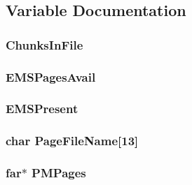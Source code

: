 \subsection{Variable Documentation}
\hypertarget{ID__PM_8H_af385634b054d3e3d81d85865b3d7e71e}{
\subsubsection[{ChunksInFile}]{ {\bf ChunksInFile}}}
\label{ID__PM_8H_af385634b054d3e3d81d85865b3d7e71e}
\hypertarget{ID__PM_8H_a0b3caaa008ec8ab4b8486880a825bad0}{
\subsubsection[{EMSPagesAvail}]{ {\bf EMSPagesAvail}}}
\label{ID__PM_8H_a0b3caaa008ec8ab4b8486880a825bad0}
\hypertarget{ID__PM_8H_ab35be0811b0150bb1a52eaad6d3d6340}{
\subsubsection[{EMSPresent}]{ {\bf EMSPresent}}}
\label{ID__PM_8H_ab35be0811b0150bb1a52eaad6d3d6340}
\hypertarget{ID__PM_8H_a3d2a1c78f3a8c484f8b2ed0cbe566453}{
\subsubsection[{PageFileName}]{\setlength{\rightskip}{0pt plus 5cm}char {\bf PageFileName}\mbox{[}13\mbox{]}}}
\label{ID__PM_8H_a3d2a1c78f3a8c484f8b2ed0cbe566453}
\hypertarget{ID__PM_8H_aac6e5bfd3ae3497c8b721679578d73f1}{
\subsubsection[{PMPages}]{ far$\ast$ {\bf PMPages}}}
\label{ID__PM_8H_aac6e5bfd3ae3497c8b721679578d73f1}
